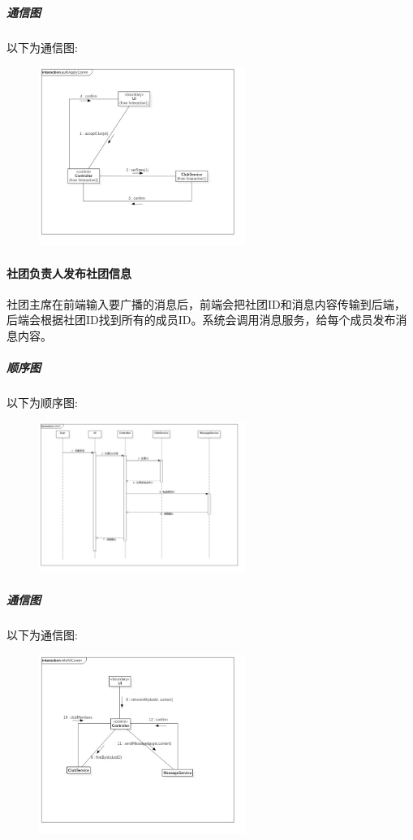 \documentclass[UTF8]{ctexart}
\begin{document}
\subparagraph*{通信图}
以下为通信图:\\
\begin{figure}[H]
\centering
\includegraphics[width = 0.6\textwidth]{authApplyComm.jpg}
\end{figure}

\paragraph{社团负责人发布社团信息}
社团主席在前端输入要广播的消息后，前端会把社团ID和消息内容传输到后端，后端会根据社团ID找到所有的成员ID。系统会调用消息服务，给每个成员发布消息内容。

\subparagraph*{顺序图}
以下为顺序图:\\
\begin{figure}[H]
\centering
\includegraphics[width = 0.6\textwidth]{infoAllSeq.jpg}
\end{figure}

\subparagraph*{通信图}
以下为通信图:\\
\begin{figure}[H]
\centering
\includegraphics[width = 0.6\textwidth]{infoAllComm.jpg}
\end{figure}
\end{document}

